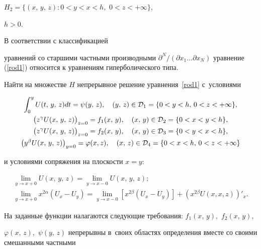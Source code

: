 $H_2=\{(x,\,y,\,z) : 0<y<x<h,$ $ 0<z<+\infty\}$, %

$h>0$.



В соответствии с классификацией


\cite{gegalov}


уравнений со старшими частными производными ${\partial^N}/({\partial x_1 \dots \partial x_N})$ уравнение (\ref{rod1}) относится к уравнениям гиперболического типа.



\begin{task}

Найти на множестве $H$ непрерывное решение уравнения~\eqref{rod1} с~усло\-виями

\begin{gather}

\int _0^yU(t,\,y,\,z)dt=\psi(y,\,z), \quad (y,\,z)\in{\cal D}_1=\{0<y<h,\,0<z<+\infty\}, \label{rod2}\\

\bigl(z^\gamma U(x,\,y,\,z)\bigr)_{z=0}=f_1(x,\,y), \quad (x,\,y)\in{\cal D}_2=\{0<x<y<h\}, \label{rod3}\\

\bigl(z^\gamma U(x,\,y,\,z)\bigr)_{z=0}=f_2(x,\,y), \quad (x,\,y)\in{\cal D}_3=\{0<y<x<h\}, \label{rod4}\\

\bigl(y^\beta U(x,\,y,\,z)\bigr)_{y=0}=\varphi(x,z), \quad (x,\,z)\in{\cal D}_4=\{0<x<h,\, 0<z<+\infty\} \label{rod5}

\end{gather}

и условиями сопряжения на плоскости $x=y${\rm:}

\begin{gather}

\lim_{y\to x+0} U(x,\,y,\,z)=\lim_{y\to x-0} U(x,\,y,\,z); \label{rod6}\\

\lim_{y \to x+0} x^{2\alpha}(U_x-U_y)=\lim_{y\to x-0} [x^{2\beta}(U_x-U_y)]+ (x^{2\beta}U(x,x,z))'_x. \label{rod7}

\end{gather}

На заданные функции налагаются следующие требования: $f_1(x,\,y),$ $f_2(x,\,y),$

 $\varphi(x,\,z),$ $\psi(y,\,z)$ непрерывны в~своих областях определения вместе со своими смешанными частными


\end{task}

